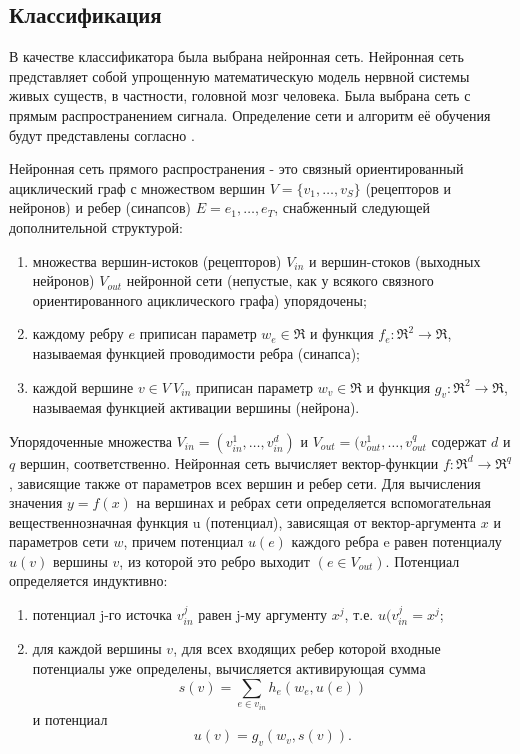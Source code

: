 \subsection{Классификация} В качестве классификатора была выбрана нейронная
сеть. Нейронная сеть представляет собой упрощенную математическую модель нервной
системы живых существ, в частности, головной мозг человека. Была выбрана сеть с
прямым распространением сигнала. Определение сети и алгоритм её обучения будут
представлены согласно \cite{merkov}.


Нейронная сеть прямого распространения - это связный ориентированный
ациклический граф с множеством вершин $V = \{v_1,\dots,v_S\}$ (рецепторов и
нейронов) и ребер (синапсов) $E = {e_1,\dots,e_T}$, снабженный следующей
дополнительной структурой:
\begin{enumerate}
\item множества вершин-истоков (рецепторов) $V_{in}$ и вершин-стоков (выходных
нейронов) $V_{out}$ нейронной сети (непустые, как у всякого связного
ориентированного ациклического графа) упорядочены;
\item каждому ребру $e$ приписан параметр $w_e \in \Re$ и функция $f_e:\Re^2 \to
\Re$, называемая функцией проводимости ребра (синапса);
\item каждой вершине $v \in V \ V_{in}$ приписан параметр $w_v \in \Re$ и
функция $g_v:\Re^2 \to \Re$, называемая функцией активации вершины (нейрона).
\end{enumerate}

Упорядоченные множества $V_{in} = (v_{in}^1,\dots,v_{in}^d)$ и $V_{out} =
(v_{out}^1,\dots,v_{out}^q$ содержат $d$ и $q$ вершин, соответственно. Нейронная
сеть вычисляет вектор-функции $f : \Re^d \to \Re^q$ , зависящие также от
параметров всех вершин и ребер сети. Для вычисления значения $y = f (x)$ на
вершинах и ребрах сети определяется вспомогательная вещественнозначная функция u
(потенциал), зависящая от вектор-аргумента $x$ и параметров сети $w$, причем
потенциал $u(e)$ каждого ребра e равен потенциалу $u(v)$ вершины $v$, из которой
это ребро выходит $(e \in V_{out})$. Потенциал определяется индуктивно:
\begin{enumerate}
\item потенциал j-го источка $v_{in}^j$ равен j-му аргументу $x^j$,
т.е. $u(v_{in}^j = x^j$;
\item для каждой вершины $v$, для всех входящих ребер которой входные потенциалы
уже определены, вычисляется активирующая сумма
\[ s(v) = \sum_{e \in v_{in}} h_e(w_e,u(e)) \] и потенциал
\[ u(v) = g_v(w_v,s(v)) .\]
\end{enumerate}

